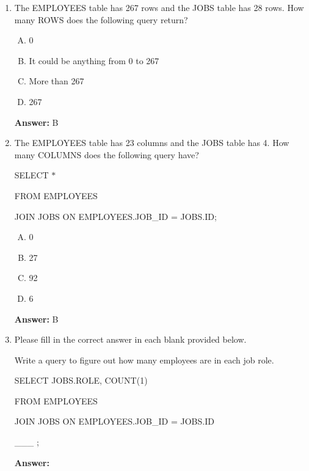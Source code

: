 \documentclass[12pt]{article}
\begin{document}
\begin{enumerate}[1.]
    \item

    The EMPLOYEES table has 267 rows and the JOBS table has 28 rows. How many ROWS
    does the following query return?

    \bigskip

    \begin{enumerate}[A.]
        \item 0
        \item It could be anything from 0 to 267
        \item More than 267
        \item 267
    \end{enumerate}

    \bigskip

    \textbf{Answer:} B

    \item

    The EMPLOYEES table has 23 columns and the JOBS table has 4. How many COLUMNS
    does the following query have?

    \bigskip

    SELECT $\ast$

    FROM EMPLOYEES

    JOIN JOBS ON EMPLOYEES.JOB\_ID = JOBS.ID;

    \begin{enumerate}[A.]
        \item 0
        \item 27
        \item 92
        \item 6
    \end{enumerate}

    \bigskip

    \textbf{Answer:} B

    \item

    Please fill in the correct answer in each blank provided below.

    \bigskip

    Write a query to figure out how many employees are in each job role.

    \bigskip

    SELECT JOBS.ROLE, COUNT(1)

    FROM EMPLOYEES

    JOIN JOBS ON EMPLOYEES.JOB\_ID = JOBS.ID

    \_\_\_ ;

    \bigskip

    \textbf{Answer:}
\end{enumerate}
\end{document}
